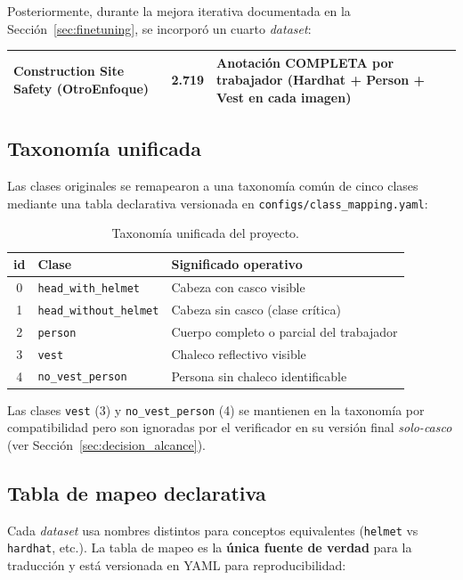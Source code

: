 \documentclass[journal,onecolumn,11pt]{IEEEtran}
\begin{document}
Posteriormente, durante la mejora iterativa documentada en la
Sección~\ref{sec:finetuning}, se incorporó un cuarto \textit{dataset}:

\begin{table}[H]
\centering
\begin{tabular}{l r p{5.5cm}}
\toprule
Construction Site Safety (OtroEnfoque) & 2.719 & Anotación COMPLETA
por trabajador (Hardhat + Person + Vest en cada imagen) \\
\bottomrule
\end{tabular}
\end{table}

\subsection{Taxonomía unificada}

Las clases originales se remapearon a una taxonomía común de cinco
clases mediante una tabla declarativa versionada en
\texttt{configs/class\_mapping.yaml}:

\begin{table}[H]
\centering
\caption{Taxonomía unificada del proyecto.}
\label{tab:taxonomia}
\begin{tabular}{c l p{7cm}}
\toprule
\textbf{id} & \textbf{Clase} & \textbf{Significado operativo} \\
\midrule
0 & \texttt{head\_with\_helmet} & Cabeza con casco visible \\
1 & \texttt{head\_without\_helmet} & Cabeza sin casco (clase crítica) \\
2 & \texttt{person} & Cuerpo completo o parcial del trabajador \\
3 & \texttt{vest} & Chaleco reflectivo visible \\
4 & \texttt{no\_vest\_person} & Persona sin chaleco identificable \\
\bottomrule
\end{tabular}
\end{table}

Las clases \texttt{vest} (3) y \texttt{no\_vest\_person} (4) se
mantienen en la taxonomía por compatibilidad pero son ignoradas por
el verificador en su versión final \emph{solo-casco} (ver
Sección~\ref{sec:decision_alcance}).

\subsection{Tabla de mapeo declarativa}

Cada \textit{dataset} usa nombres distintos para conceptos
equivalentes (\texttt{helmet} vs \texttt{hardhat}, etc.). La tabla
de mapeo es la \textbf{única fuente de verdad} para la traducción y
está versionada en YAML para reproducibilidad:
\end{document}
